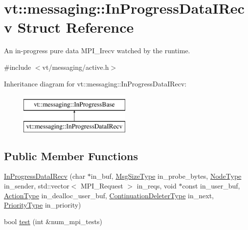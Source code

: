 \hypertarget{structvt_1_1messaging_1_1_in_progress_data_i_recv}{}\section{vt\+:\+:messaging\+:\+:In\+Progress\+Data\+I\+Recv Struct Reference}
\label{structvt_1_1messaging_1_1_in_progress_data_i_recv}


An in-\/progress pure data M\+P\+I\+\_\+\+Irecv watched by the runtime.  




{\ttfamily \#include $<$vt/messaging/active.\+h$>$}

Inheritance diagram for vt\+:\+:messaging\+:\+:In\+Progress\+Data\+I\+Recv\+:\begin{figure}[H]
\begin{center}
\leavevmode
\includegraphics[height=2.000000cm]{structvt_1_1messaging_1_1_in_progress_data_i_recv}
\end{center}
\end{figure}
\subsection*{Public Member Functions}
\begin{DoxyCompactItemize}
\item 
\hyperlink{structvt_1_1messaging_1_1_in_progress_data_i_recv_af2bf74787f28b863c0dfc355d176d819}{In\+Progress\+Data\+I\+Recv} (char $\ast$in\+\_\+buf, \hyperlink{namespacevt_a408e86a8c7c89309b52907dc5a513924}{Msg\+Size\+Type} in\+\_\+probe\+\_\+bytes, \hyperlink{namespacevt_a866da9d0efc19c0a1ce79e9e492f47e2}{Node\+Type} in\+\_\+sender, std\+::vector$<$ M\+P\+I\+\_\+\+Request $>$ in\+\_\+reqs, void $\ast$const in\+\_\+user\+\_\+buf, \hyperlink{namespacevt_ae0a5a7b18cc99d7b732cb4d44f46b0f3}{Action\+Type} in\+\_\+dealloc\+\_\+user\+\_\+buf, \hyperlink{namespacevt_a6de3bd201e2a040be9362d9d24d1e446}{Continuation\+Deleter\+Type} in\+\_\+next, \hyperlink{namespacevt_a86bff9f556eb761b27fc8600d006ac04}{Priority\+Type} in\+\_\+priority)
\item 
bool \hyperlink{structvt_1_1messaging_1_1_in_progress_data_i_recv_a5d7e51732503e70a684f27a8c2985dc9}{test} (int \&num\+\_\+mpi\+\_\+tests)
\end{DoxyCompactItemize}
